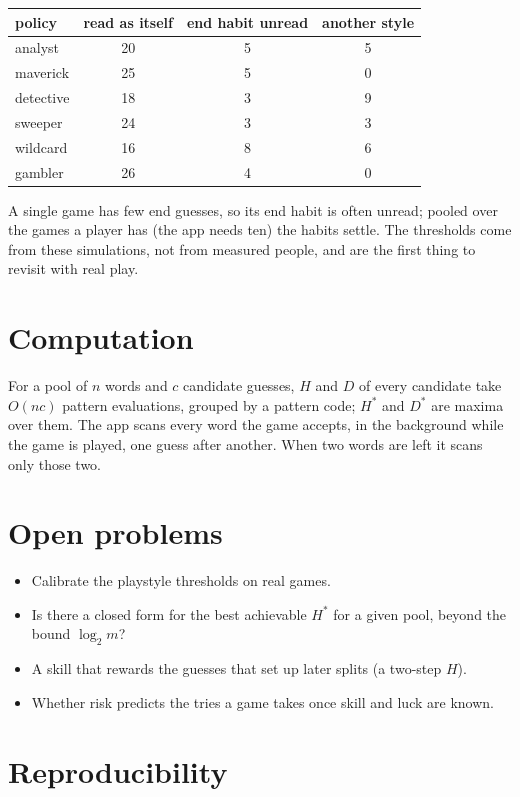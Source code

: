 \documentclass[11pt]{article}
\theoremstyle{definition}
\theoremstyle{remark}
\begin{document}
\begin{center}
\begin{tabular}{lccc}
\toprule
policy & read as itself & end habit unread & another style\\
\midrule
analyst & 20 & 5 & 5\\
maverick & 25 & 5 & 0\\
detective & 18 & 3 & 9\\
sweeper & 24 & 3 & 3\\
wildcard & 16 & 8 & 6\\
gambler & 26 & 4 & 0\\
\bottomrule
\end{tabular}
\end{center}

A single game has few end guesses, so its end habit is often unread; pooled over the
games a player has (the app needs ten) the habits settle. The thresholds come from
these simulations, not from measured people, and are the first thing to revisit with
real play.

\section{Computation}\label{sec:computation}

For a pool of $n$ words and $c$ candidate guesses, $H$ and $D$ of every candidate take
$O(nc)$ pattern evaluations, grouped by a pattern code; $H^*$ and $D^*$ are maxima over
them. The app scans every word the game accepts, in the background while the game is
played, one guess after another. When two words are left it scans only those two.

\section{Open problems}\label{sec:open}

\begin{itemize}
\item Calibrate the playstyle thresholds on real games.
\item Is there a closed form for the best achievable $H^*$ for a given pool, beyond
the bound $\log_2 m$?
\item A skill that rewards the guesses that set up later splits (a two-step $H$).
\item Whether risk predicts the tries a game takes once skill and luck are known.
\end{itemize}

\section{Reproducibility}\label{sec:repro}
\end{document}

